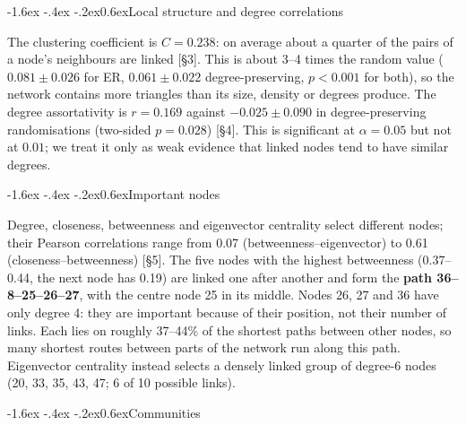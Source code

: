 \documentclass[10pt,a4paper]{article}
\makeatletter
\renewcommand\section{\@startsection{section}{1}{\z@}%
  {-1.6ex \@plus -.4ex \@minus -.2ex}{0.6ex}{\normalfont\large\bfseries}}
\makeatother
\begin{document}
\section{Local structure and degree correlations}

The clustering coefficient is $C = 0.238$: on average about a quarter of the pairs of a node's
neighbours are linked [\S3]. This is about 3--4 times the random value
($0.081 \pm 0.026$ for ER, $0.061 \pm 0.022$ degree-preserving, $p < 0.001$ for both), so the network
contains more triangles than its size, density or degrees produce. The degree assortativity is
$r = 0.169$ against $-0.025 \pm 0.090$ in degree-preserving randomisations (two-sided $p = 0.028$)
[\S4]. This is significant at $\alpha = 0.05$ but not at $0.01$; we treat it only as weak evidence
that linked nodes tend to have similar degrees.

\section{Important nodes}

Degree, closeness, betweenness and eigenvector centrality select different nodes; their Pearson
correlations range from 0.07 (betweenness--eigenvector) to 0.61 (closeness--betweenness) [\S5].
The five nodes with the highest betweenness (0.37--0.44, the next node has 0.19) are linked one
after another and form the \textbf{path 36--8--25--26--27}, with the centre node 25 in its middle.
Nodes 26, 27 and 36 have only degree 4: they are important because of their position, not their
number of links. Each lies on roughly 37--44\% of the shortest paths between
other nodes, so many shortest routes between parts of the network run along this path. Eigenvector
centrality instead selects a densely linked group of degree-6 nodes (20, 33, 35, 43, 47; 6 of 10
possible links).

\section{Communities}
\end{document}
